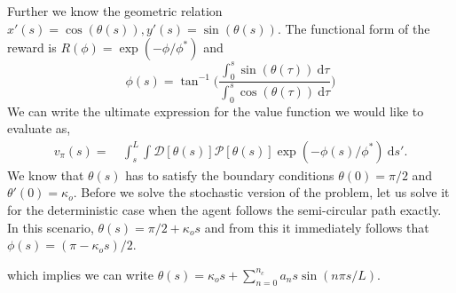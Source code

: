 \documentclass[12pt]{article}
\def\d{\text{d}}
\def\r{\mathbf{r}}
\def\th{\hat{\mathbf{t}}}
\def\P{\mathcal{P}}
\def\D{\mathcal{D}}
\begin{document}
Further we know the geometric relation $x'(s) = \cos(\theta(s)), y'(s) = \sin(\theta(s))$. The functional
form of the reward is $R(\phi) = \exp(-\phi/\phi^*)$ and 
\[
    \phi(s) = \tan^{-1}\bigg( \frac{\int_0^s \sin(\theta(\tau)) \ \d \tau}{\int_0^s \cos(\theta(\tau)) \ \d \tau} \bigg)
\]
We can write the ultimate expression for the value function we would like to evaluate as,
\begin{align}
    v_\pi(s) =& \ \int_{s}^L \int \D[\theta(s)] \P[\theta(s)] \exp(-\phi(s)/\phi^*) \ \d s'.
\end{align}
We know that $\theta(s)$ has to satisfy the boundary conditions $\theta(0) = \pi/2$ and $\theta'(0) = \kappa_o$.
Before we solve the stochastic version of the problem, let us solve it for the deterministic case when
the agent follows the semi-circular path exactly. In this scenario, $\theta(s) = \pi/2 + \kappa_o s$ and
from this it immediately follows that $\phi(s) = (\pi - \kappa_o s)/2$.


which implies we can write $\theta(s) = \kappa_o s + \sum_{n=0}^{n_c} a_n s \sin(n \pi s/L)$.


\end{document}
